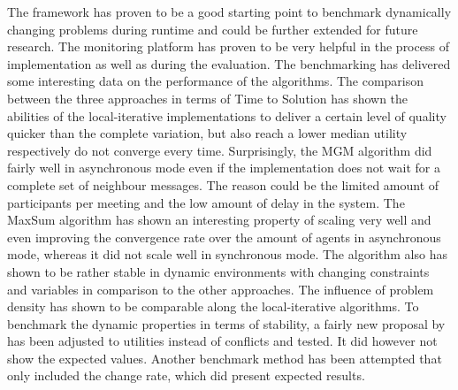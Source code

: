 The framework has proven to be a good starting point to benchmark dynamically changing problems during runtime and could be further extended for future research. The monitoring platform has proven to be very helpful in the process of implementation as well as during the evaluation. The benchmarking has delivered some interesting data on the performance of the algorithms. The comparison between the three approaches in terms of Time to Solution has shown the abilities of the local-iterative implementations to deliver a certain level of quality quicker than the complete variation, but also reach a lower median utility respectively do not converge every time. Surprisingly, the MGM algorithm did fairly well in asynchronous mode even if the implementation does not wait for a complete set of neighbour messages. The reason could be the limited amount of participants per meeting and the low amount of delay in the system. The MaxSum algorithm has shown an interesting property of scaling very well and even improving the convergence rate over the amount of agents in asynchronous mode, whereas it did not scale well in synchronous mode. The algorithm also has shown to be rather stable in dynamic environments with changing constraints and variables in comparison to the other approaches.  The influence of problem density has shown to be comparable along the local-iterative algorithms. To benchmark the dynamic properties in terms of stability, a fairly new proposal by \cite{Maillera} has been adjusted to utilities instead of conflicts and tested. It did however not show the expected values. Another benchmark method has been attempted that only included the change rate, which did present expected results. 
 \newline \newline

